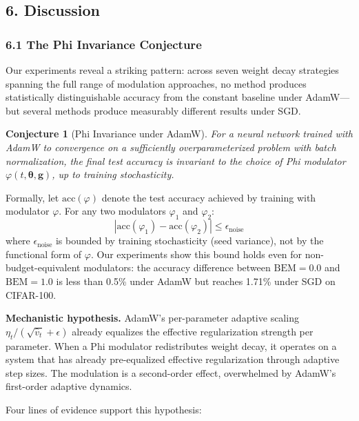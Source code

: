 \documentclass[
]{article}
\begin{document}
\hypertarget{discussion}{%
\subsection{6. Discussion}\label{discussion}}

\hypertarget{the-phi-invariance-conjecture}{%
\subsubsection{6.1 The Phi Invariance
Conjecture}\label{the-phi-invariance-conjecture}}

Our experiments reveal a striking pattern: across seven weight decay
strategies spanning the full range of modulation approaches, no method
produces statistically distinguishable accuracy from the constant
baseline under AdamW---but several methods produce measurably different
results under SGD.

\textbf{Conjecture 1} (Phi Invariance under AdamW). \emph{For a neural
network trained with AdamW to convergence on a sufficiently
overparameterized problem with batch normalization, the final test
accuracy is invariant to the choice of Phi modulator
\(\varphi(t, \boldsymbol{\theta}, \mathbf{g})\), up to training
stochasticity.}

Formally, let \(\mathrm{acc}(\varphi)\) denote the test accuracy
achieved by training with modulator \(\varphi\). For any two modulators
\(\varphi_1\) and \(\varphi_2\): \[
|\mathrm{acc}(\varphi_1) - \mathrm{acc}(\varphi_2)| \leq \epsilon_{\mathrm{noise}}
\] where \(\epsilon_{\mathrm{noise}}\) is bounded by training
stochasticity (seed variance), not by the functional form of
\(\varphi\). Our experiments show this bound holds even for
non-budget-equivalent modulators: the accuracy difference between
\(\mathrm{BEM} = 0.0\) and \(\mathrm{BEM} = 1.0\) is less than 0.5\%
under AdamW but reaches 1.71\% under SGD on CIFAR-100.

\textbf{Mechanistic hypothesis.} AdamW's per-parameter adaptive scaling
\(\eta_t / (\sqrt{\hat{v}_t} + \epsilon)\) already equalizes the
effective regularization strength per parameter. When a Phi modulator
redistributes weight decay, it operates on a system that has already
pre-equalized effective regularization through adaptive step sizes. The
modulation is a second-order effect, overwhelmed by AdamW's first-order
adaptive dynamics.

Four lines of evidence support this hypothesis:
\end{document}
